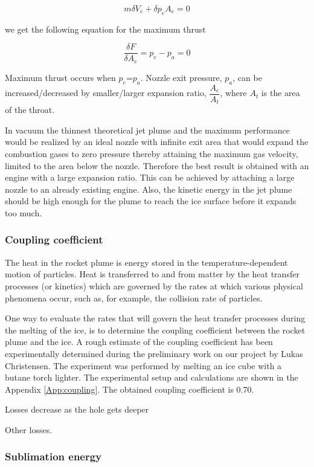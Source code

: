 \begin{equation}
m\delta V_e+\delta p_e A_e=0
\end{equation}

we get the following equation for the maximum thrust

\begin{equation}
\dfrac{\delta F}{\delta A_e}=p_e-p_a=0 
\end{equation}

Maximum thrust occurs when $p_e$=$p_a$. Nozzle exit pressure, $p_a$, can be increased/decreased by smaller/larger expansion ratio, $\dfrac{A_e}{A_t}$, where $A_t$ is the area of the throat. 

In vacuum the thinnest theoretical jet plume and the maximum performance would be realized by an ideal nozzle with infinite exit area that would expand the combustion gases to zero pressure thereby attaining the maximum gas velocity, limited to the area below the nozzle. Therefore the best result is obtained with an engine with a large expansion ratio. This can be achieved by attaching a large nozzle to an already existing engine. Also, the kinetic energy in the jet plume should be high enough for the plume to reach the ice surface before it expands too much. 


\subsubsection{Coupling coefficient}
The heat in the rocket plume is energy stored in the temperature-dependent motion of particles. Heat is transferred to and from matter by the heat transfer processes (or kinetics) which are governed by the rates at which various physical phenomena occur, such as, for example, the collision rate of particles. 

One way to evaluate the rates that will govern the heat transfer processes during the melting of the ice, is to determine the coupling coefficient between the rocket plume and the ice. A rough estimate of the coupling coefficient has been experimentally determined during the preliminary work on our project by Lukas Christensen. The experiment was performed by melting an ice cube with a butane torch lighter. The experimental setup and calculations are shown in the Appendix \ref{App:coupling}. The obtained coupling coefficient is 0.70.


Losses decrease as the hole gets deeper

Other losses. 

\subsubsection{Sublimation energy}

